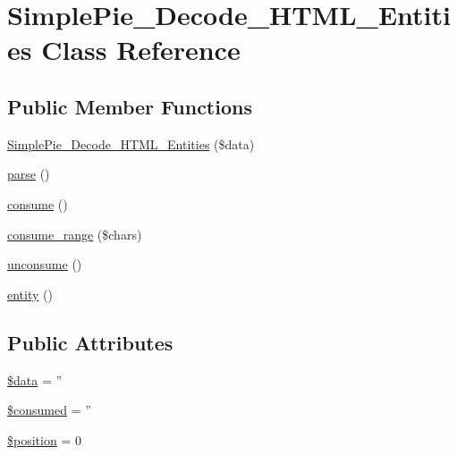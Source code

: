 \hypertarget{class_simple_pie___decode___h_t_m_l___entities}{\section{Simple\-Pie\-\_\-\-Decode\-\_\-\-H\-T\-M\-L\-\_\-\-Entities Class Reference}
\label{class_simple_pie___decode___h_t_m_l___entities}
}
\subsection*{Public Member Functions}
\begin{DoxyCompactItemize}
\item 
\hyperlink{class_simple_pie___decode___h_t_m_l___entities_a6ff73361bee6e2351ed2bb00bb642391}{Simple\-Pie\-\_\-\-Decode\-\_\-\-H\-T\-M\-L\-\_\-\-Entities} (\$data)
\item 
\hyperlink{class_simple_pie___decode___h_t_m_l___entities_ab914172ff559413b2b083f6f2914e3b1}{parse} ()
\item 
\hyperlink{class_simple_pie___decode___h_t_m_l___entities_ab13cda3d8f9de56016675155fa332eed}{consume} ()
\item 
\hyperlink{class_simple_pie___decode___h_t_m_l___entities_a39c76fae36a4a3b4d474e11025f7eb83}{consume\-\_\-range} (\$chars)
\item 
\hyperlink{class_simple_pie___decode___h_t_m_l___entities_ab671e4fd9fa5f7d1f8eef60808e798a2}{unconsume} ()
\item 
\hyperlink{class_simple_pie___decode___h_t_m_l___entities_a88d1abac58c50aa674196d12620a53bc}{entity} ()
\end{DoxyCompactItemize}
\subsection*{Public Attributes}
\begin{DoxyCompactItemize}
\item 
\hyperlink{class_simple_pie___decode___h_t_m_l___entities_a59c6ca6838e6f03bc69e1fa1ba51fa74}{\$data} = ''
\item 
\hyperlink{class_simple_pie___decode___h_t_m_l___entities_acf3fb93427ab30b8d8f207ddc6dcdbe0}{\$consumed} = ''
\item 
\hyperlink{class_simple_pie___decode___h_t_m_l___entities_abbf26bb22f76c1cbe09aaa17e18a7377}{\$position} = 0
\end{DoxyCompactItemize}


